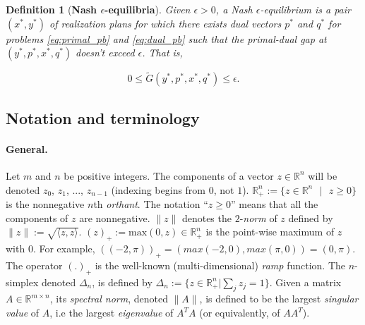 \documentclass[a4paper,9pt]{extarticle}
\newtheorem{definition}{Definition}
\begin{document}
\begin{definition}[\textbf{Nash $\epsilon$-equilibria}]
Given $\epsilon > 0$, a Nash $\epsilon$-equilibrium is
a pair $(x^*, y^*)$ of realization plans for which there exists dual
vectors $p^*$ and $q^*$ for problems \eqref{eq:primal_pb} and
\eqref{eq:dual_pb} such that the primal-dual gap at $(y^*, p^*, x^*, q^*)$
doesn't exceed $\epsilon$. That is,

\begin{equation}
  0 \le \tilde{G}(y^*, p^*, x^*, q^*) \le \epsilon.
\label{eq:approx_pb}
\end{equation}
\label{thm:approx_nash}
\end{definition}

\subsection{Notation and terminology}
\paragraph*{General.} Let $m$ and $n$ be positive integers.
The components of a vector $z \in \mathbb{R}^n$ will be
denoted $z_0$, $z_1$, ..., $z_{n-1}$ (indexing begins from $0$,
not $1$). $\mathbb{R}^{n}_+ := \{z \in \mathbb{R}^{n}\text{ }|\text{ }
z \geq 0\}$ is the nonnegative $n$th \textit{orthant}.
The notation ``$z \ge 0$'' means that all the components of
$z$ are nonnegative.
$\|z\|$ denotes the $2$-\textit{norm} of $z$ defined by $\|z\| :=
\sqrt{\langle z, z\rangle}$. $(z)_+:=\text{max}(0, z) \in
\mathbb{R}^{n}_+$ is the point-wise maximum of $z$ with $0$. For
example, $((-2, \pi))_+ = (max(-2, 0), max(\pi, 0)) = (0, \pi)$. The
operator $(.)_+$ is the well-known (multi-dimensional) \textit{ramp}
function. The $n$-simplex denoted $\Delta_n$, is defined by $\Delta_n
:= \{z \in \mathbb{R}^n_+|\sum_j z_j = 1\}$.
Given a matrix $A \in \mathbb{R}^{m \times n}$, its \textit{spectral
  norm}, denoted $\|A\|$, is
 defined to be the largest \textit{singular value} of $A$, i.e the
 largest \textit{eigenvalue} of $A^TA$ (or equivalently, of $AA^T$).
\end{document}
